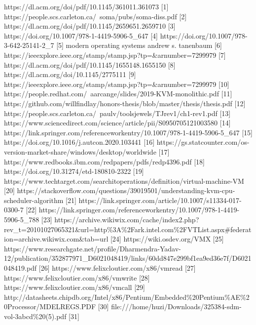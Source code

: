 \documentclass{report}
\begin{document}
\begin{spacing}{1.5}
{\large
https://dl.acm.org/doi/pdf/10.1145/361011.361073 [1]
https://people.scs.carleton.ca/~soma/pubs/soma-diss.pdf [2]
https://dl.acm.org/doi/pdf/10.1145/2659651.2659710 [3]
https://doi.org/10.1007/978-1-4419-5906-5\_647 [4]
https://doi.org/10.1007/978-3-642-25141-2\_7 [5]
modern operating systems andrew s. tanenbaum [6]
https://ieeexplore.ieee.org/stamp/stamp.jsp?tp=\&arnumber=7299979 [7]
https://dl.acm.org/doi/pdf/10.1145/1655148.1655150 [8]
https://dl.acm.org/doi/10.1145/2775111 [9]
https://ieeexplore.ieee.org/stamp/stamp.jsp?tp=\&arnumber=7299979 [10]
https://people.redhat.com/~aarcange/slides/2019-KVM-monolithic.pdf [11]
https://github.com/willfindlay/honors-thesis/blob/master/thesis/thesis.pdf [12]
https://people.scs.carleton.ca/~paulv/toolsjewels/TJrev1/ch1-rev1.pdf [13]
https://www.sciencedirect.com/science/article/pii/S0950705121003580 [14]
https://link.springer.com/referenceworkentry/10.1007/978-1-4419-5906-5\_647 [15]
https://doi.org/10.1016/j.autcon.2020.103441 [16]
https://gs.statcounter.com/os-version-market-share/windows/desktop/worldwide [17]
https://www.redbooks.ibm.com/redpapers/pdfs/redp4396.pdf [18]
https://doi.org/10.31274/etd-180810-2322 [19]
https://www.techtarget.com/searchitoperations/definition/virtual-machine-VM [20]
https://stackoverflow.com/questions/39019501/understanding-kvm-cpu-scheduler-algorithm [21]
https://link.springer.com/article/10.1007/s11334-017-0300-7 [22]
https://link.springer.com/referenceworkentry/10.1007/978-1-4419-5906-5\_788 [23]
https://archive.wikiwix.com/cache/index2.php?rev\_t=20101027065321\&url=http\%3A\%2Fark.intel.com\%2FVTList.aspx\#federation=archive.wikiwix.com\&tab=url [24]
https://wiki.osdev.org/VMX [25]
https://www.researchgate.net/profile/Dharmendra-Yadav-12/publication/352877971\_D6021048419/links/60dd847e299bf1ea9ed36e7f/D6021048419.pdf [26]
https://www.felixcloutier.com/x86/vmread [27]
https://www.felixcloutier.com/x86/vmwrite [28]
https://www.felixcloutier.com/x86/vmcall [29]
http://datasheets.chipdb.org/Intel/x86/Pentium/Embedded\%20Pentium\%AE\%20Processor/MDELREGS.PDF [30]
file:///home/huzi/Downloads/325384-sdm-vol-3abcd\%20(5).pdf [31]
}
\end{spacing}
\end{document}
